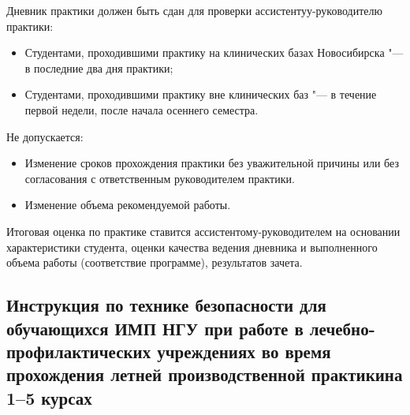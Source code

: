 \documentclass[a4paper,14pt]{extarticle}
\begin{document}
Дневник практики должен быть сдан для проверки ассистентуу\hyp{}руководителю практики:

\begin{itemize}
\item Студентами, проходившими практику на клинических базах Новосибирска "--- в последние два дня практики;
\item Студентами, проходившими практику вне клинических баз "--- в течение первой недели, после начала осеннего семестра.
\end{itemize}

Не допускается:

\begin{itemize}
\item Изменение сроков прохождения практики без уважительной причины или без согласования с ответственным руководителем практики.
\item Изменение объема рекомендуемой работы.
\end{itemize}

Итоговая оценка по практике ставится ассистентому\hyp{}руководителем на основании характеристики студента, оценки качества ведения дневника и выполненного объема работы (соответствие программе), результатов зачета.

\subsection*{Инструкция по технике безопасности для обучающихся ИМП НГУ при работе в лечебно-профилактических учреждениях во время прохождения летней производственной практикина 1--5 курсах}
\end{document}

